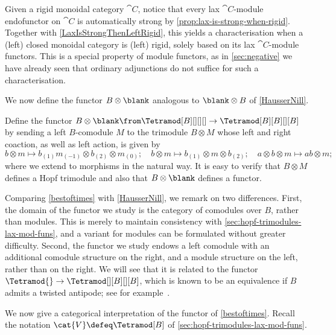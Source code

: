 \begin{remark}\label{rmk:rigid-iff-lax-is-strong}
  Given a rigid monoidal category \(\cat{C}\),
  notice that every lax \(\cat{C}\)\hyp{}module endofunctor on \(\cat{C}\) is automatically strong by \cref{prop:lax-is-strong-when-rigid}.
  Together with \cref{LaxIsStrongThenLeftRigid},
  this yields a characterisation when a (left) closed monoidal category is (left) rigid,
  solely based on its lax \(\cat{C}\)\hyp{}module functors.
  This is a special property of module functors,
  as in \cref{sec:negative} we have already seen that ordinary adjunctions do not suffice for such a characterisation.
\end{remark}

We now define the functor \(B \otimes \blank\) analogous to \(\blank \otimes B\) of \cref{HausserNill}.

\begin{definition}\label{bestoftimes}
  Define the functor \(B \otimes \blank\from \Tetramod[B][][][] \to \Tetramod[B][B][][B]\)
  by sending a left \(B\)\hyp{}comodule \(M\) to the trimodule \(B \otimes M\) whose left and right coaction,
  as well as left action, is given by
  \[
    b \otimes m \mapsto b_{(1)}m_{(-1)} \otimes b_{(2)} \otimes m_{(0)}; \quad
    b \otimes m \mapsto b_{(1)}\otimes m \otimes b_{(2)}; \quad
    a \otimes b \otimes m \mapsto ab \otimes m;
  \]
  where we extend to morphisms in the natural way.
  It is easy to verify that \(B \otimes M\) defines a Hopf trimodule and also that \(B \otimes \blank\) defines a functor.
\end{definition}

\begin{remark}
  Comparing \cref{bestoftimes} with \cref{HausserNill}, we remark on two differences.
  First, the domain of the functor we study is the category of comodules over \(B\), rather than modules.
  This is merely to maintain consistency with \cref{sec:hopf-trimodules-lax-mod-funs},
  and a variant for modules can be formulated without greater difficulty.
  Second, the functor we study endows a left comodule with an additional comodule structure on the right,
  and a module structure on the left, rather than on the right.
  We will see that it is related to the functor \(\Tetramod{} \to \Tetramod[][B][][B]\),
  which is known to be an equivalence if \(B\) admits a twisted antipode;
  see for example~\cite[Section~1.9.4]{montgomery93:hopf}.
\end{remark}

We now give a categorical interpretation of the functor of \cref{bestoftimes}.
Recall the notation \(\cat{V} \defeq \Tetramod[B]\) of \cref{sec:hopf-trimodules-lax-mod-funs}.

